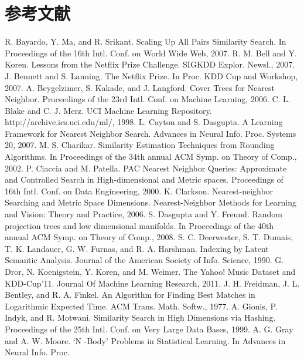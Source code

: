 \documentclass[twocolumn,a4paper]{article}
\begin{document}
\section{参考文献}
\renewcommand{\section}[2]{}
\begin{thebibliography}{1}
 R. Bayardo, Y. Ma, and R. Srikant. Scaling Up All Pairs Similarity Search. In Proceedings of the 16th Intl. Conf. on World Wide Web, 2007.
 R. M. Bell and Y. Koren. Lessons from the Netflix Prize Challenge. SIGKDD Explor. Newsl., 2007.
 J. Bennett and S. Lanning. The Netflix Prize. In Proc. KDD Cup and Workshop, 2007.
 A. Beygelzimer, S. Kakade, and J. Langford. Cover Trees for Nearest Neighbor. Proceedings of the 23rd
Intl. Conf. on Machine Learning, 2006.
 C. L. Blake and C. J. Merz. UCI Machine Learning Repository. http://archive.ics.uci.edu/ml/, 1998.
 L. Cayton and S. Dasgupta. A Learning Framework for Nearest Neighbor Search. Advances in Neural Info.
Proc. Systems 20, 2007.
 M. S. Charikar. Similarity Estimation Techniques from Rounding Algorithms. In Proceedings of the 34th
annual ACM Symp. on Theory of Comp., 2002.
 P. Ciaccia and M. Patella. PAC Nearest Neighbor Queries: Approximate and Controlled Search in High-dimensional and Metric spaces. Proceedings of 16th Intl. Conf. on Data Engineering, 2000.
 K. Clarkson. Nearest-neighbor Searching and Metric Space Dimensions. Nearest-Neighbor Methods for
Learning and Vision: Theory and Practice, 2006.
 S. Dasgupta and Y. Freund. Random projection trees and low dimensional manifolds. In Proceedings of the
40th annual ACM Symp. on Theory of Comp., 2008.
 S. C. Deerwester, S. T. Dumais, T. K. Landauer, G. W. Furnas, and R. A. Harshman. Indexing by
Latent Semantic Analysis. Journal of the American Society of Info. Science, 1990.
 G. Dror, N. Koenigstein, Y. Koren, and M. Weimer. The Yahoo! Music Dataset and KDD-Cup’11. Journal
Of Machine Learning Research, 2011.
 J. H. Freidman, J. L. Bentley, and R. A. Finkel. An Algorithm for Finding Best Matches in Logarithmic Expected Time. ACM Trans. Math. Softw., 1977.
 A. Gionis, P. Indyk, and R. Motwani. Similarity Search in High Dimensions via Hashing. Proceedings of the 25th Intl. Conf. on Very Large Data Bases, 1999.
 A. G. Gray and A. W. Moore. ‘N -Body’ Problems in Statistical Learning. In Advances in Neural Info. Proc.

\end{thebibliography}
\end{document}
